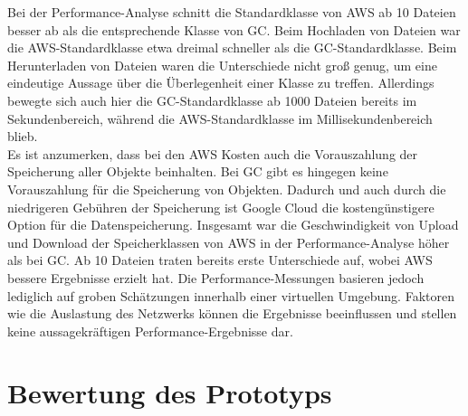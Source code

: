 Bei der Performance-Analyse schnitt die Standardklasse von AWS ab 10 Dateien besser ab als die entsprechende Klasse von GC. Beim Hochladen von Dateien war die AWS-Standardklasse etwa dreimal schneller als die GC-Standardklasse. Beim Herunterladen von Dateien waren die Unterschiede nicht groß genug, um eine eindeutige Aussage über die Überlegenheit einer Klasse zu treffen. Allerdings bewegte sich auch hier die GC-Standardklasse ab 1000 Dateien bereits im Sekundenbereich, während die AWS-Standardklasse im Millisekundenbereich blieb.\\

Es ist anzumerken, dass bei den AWS Kosten auch die Vorauszahlung der Speicherung aller Objekte beinhalten. Bei GC gibt es hingegen keine Vorauszahlung für die Speicherung von Objekten. Dadurch und auch durch die niedrigeren Gebühren der Speicherung ist Google Cloud die kostengünstigere Option für die Datenspeicherung. Insgesamt war die Geschwindigkeit von Upload und Download der Speicherklassen von AWS in der Performance-Analyse höher als bei GC. Ab 10 Dateien traten bereits erste Unterschiede auf, wobei AWS bessere Ergebnisse erzielt hat. Die Performance-Messungen basieren jedoch lediglich auf groben Schätzungen innerhalb einer virtuellen Umgebung. Faktoren wie die Auslastung des Netzwerks können die Ergebnisse beeinflussen und stellen keine aussagekräftigen Performance-Ergebnisse dar.\\

\section{Bewertung des Prototyps}

